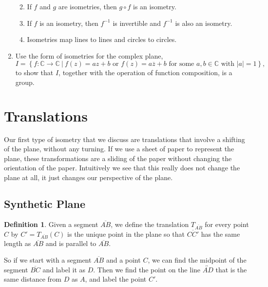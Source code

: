 \documentclass[
]{book}
\providecommand{\tightlist}{%
  \setlength{\itemsep}{0pt}\setlength{\parskip}{0pt}}
\let\stdsection\section
\renewcommand\section{\newpage\stdsection}
\theoremstyle{definition}
\newtheorem{definition}{Definition}[chapter]
\theoremstyle{definition}
\theoremstyle{definition}
\theoremstyle{definition}
\theoremstyle{remark}
\begin{document}
\begin{enumerate}
  \begin{enumerate}
  \def\labelenumii{\alph{enumii}.}
  \tightlist
  \item
    If \(f\) and \(g\) are isometries, then \(g\circ f\) is an isometry.
  \item
    If \(f\) is an isometry, then \(f^{-1}\) is invertible and \(f^{-1}\) is also an isometry.
  \item
    Isometries map lines to lines and circles to circles.
  \end{enumerate}
\item
  Use the form of isometries for the complex plane, \[I = \left\{ f: \mathbb{C} \rightarrow \mathbb{C} \:\vert \: f(z)=a z+b \mbox{ or } f(z)=a \overline{z}+b \mbox{ for some } a, b \in \mathbb{C} \mbox{ with } |a|=1 \right\},\] to show that \(I\), together with the operation of function composition, is a group.
\end{enumerate}

\hypertarget{translations}{%
\section{Translations}\label{translations}}

Our first type of isometry that we discuss are translations that involve a shifting of the plane, without any turning. If we use a sheet of paper to represent the plane, these transformations are a sliding of the paper without changing the orientation of the paper. Intuitively we see that this really does not change the plane at all, it just changes our perspective of the plane.

\hypertarget{synthetic-plane-1}{%
\subsection{Synthetic Plane}\label{synthetic-plane-1}}

\begin{definition}
Given a segment \(\overline{AB}\), we define the translation \(T_{\overline{AB}}\) for every point \(C\) by \(C'=T_{\overline{AB}}(C)\) is the unique point in the plane so that \(\overline{CC'}\) has the same length as \(\overline{AB}\) and is parallel to \(\overline{AB}\).
\end{definition}

So if we start with a segment \(\overline{AB}\) and a point \(C\), we can find the midpoint of the segment \(\overline{BC}\) and label it as \(D\). Then we find the point on the line \(\overleftrightarrow{AD}\) that is the same distance from \(D\) as \(A\), and label the point \(C'\).
\end{document}
